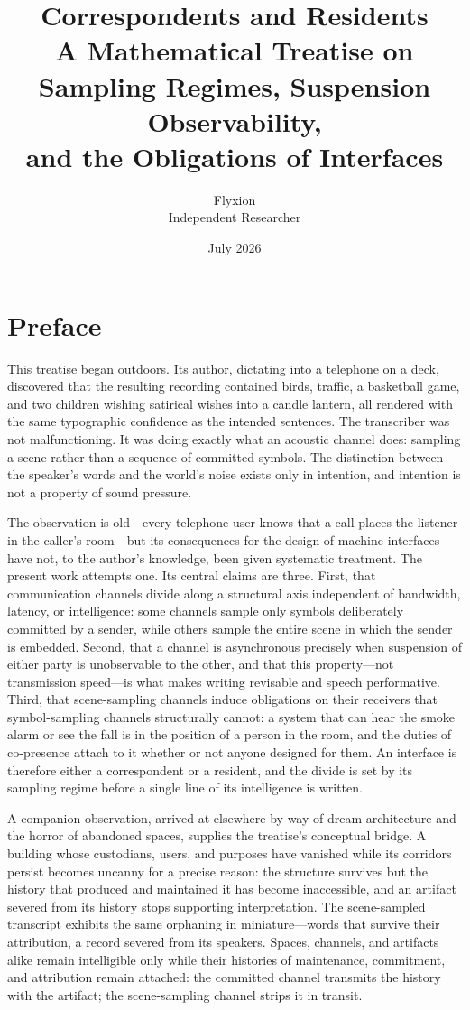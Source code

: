 \documentclass[11pt,oneside]{book}
\title{\LARGE\bfseries Correspondents and Residents\\[6pt]
\large A Mathematical Treatise on Sampling Regimes, Suspension Observability,\\ and the Obligations of Interfaces}
\author{Flyxion\\ \normalsize Independent Researcher}
\date{July 2026}
\theoremstyle{plain}
\theoremstyle{definition}
\theoremstyle{remark}
\begin{document}
\frontmatter
\maketitle

\chapter*{Preface}

This treatise began outdoors. Its author, dictating into a telephone on a deck, discovered that the resulting recording contained birds, traffic, a basketball game, and two children wishing satirical wishes into a candle lantern, all rendered with the same typographic confidence as the intended sentences. The transcriber was not malfunctioning. It was doing exactly what an acoustic channel does: sampling a scene rather than a sequence of committed symbols. The distinction between the speaker's words and the world's noise exists only in intention, and intention is not a property of sound pressure.

The observation is old---every telephone user knows that a call places the listener in the caller's room---but its consequences for the design of machine interfaces have not, to the author's knowledge, been given systematic treatment. The present work attempts one. Its central claims are three. First, that communication channels divide along a structural axis independent of bandwidth, latency, or intelligence: some channels sample only symbols deliberately committed by a sender, while others sample the entire scene in which the sender is embedded. Second, that a channel is asynchronous precisely when suspension of either party is unobservable to the other, and that this property---not transmission speed---is what makes writing revisable and speech performative. Third, that scene-sampling channels induce obligations on their receivers that symbol-sampling channels structurally cannot: a system that can hear the smoke alarm or see the fall is in the position of a person in the room, and the duties of co-presence attach to it whether or not anyone designed for them. An interface is therefore either a correspondent or a resident, and the divide is set by its sampling regime before a single line of its intelligence is written.

A companion observation, arrived at elsewhere by way of dream architecture and the horror of abandoned spaces, supplies the treatise's conceptual bridge. A building whose custodians, users, and purposes have vanished while its corridors persist becomes uncanny for a precise reason: the structure survives but the history that produced and maintained it has become inaccessible, and an artifact severed from its history stops supporting interpretation. The scene-sampled transcript exhibits the same orphaning in miniature---words that survive their attribution, a record severed from its speakers. Spaces, channels, and artifacts alike remain intelligible only while their histories of maintenance, commitment, and attribution remain attached: the committed channel transmits the history with the artifact; the scene-sampling channel strips it in transit.
\end{document}
